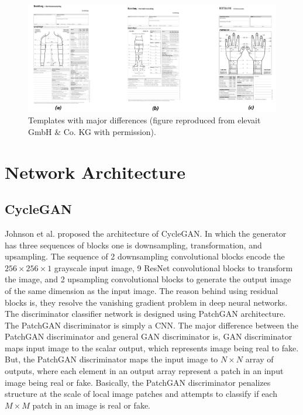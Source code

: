 \begin{figure}[H]
        \begin{center}
	    \includegraphics[scale=0.30]{images/Implementation/TemplatesWithMajorDifference.png}
	    \caption[Templates with major differences.]{Templates with major differences (figure reproduced from elevait GmbH \& Co. KG with permission).}
	    \label{fig:TemplatesWithMajorDifference}
	    \end{center}
\end{figure}






\section{Network Architecture}\label{NetworkArchitecture}

\subsection{\ac{CycleGAN}}

Johnson et al.\cite{johnson2016perceptual} proposed the architecture of \ac{CycleGAN}. In which the generator has three sequences of blocks one is downsampling, transformation, and upsampling. The sequence of 2 downsampling convolutional blocks encode the $256 \times 256 \times 1$ grayscale input image, 9 \ac{ResNet} convolutional blocks to transform the image, and 2 upsampling convolutional blocks to generate the output image of the same dimension as the input image. The reason behind using residual blocks is, they resolve the vanishing gradient problem in deep neural networks. The discriminator classifier network is designed using PatchGAN architecture\cite{isola2018imagetoimage}\cite{li2016precomputed}. The PatchGAN discriminator is simply a \ac{CNN}. The major difference between the PatchGAN discriminator and general \ac{GAN} discriminator is, \ac{GAN} discriminator maps input image to the scalar output, which represents image being real to fake. But, the PatchGAN discriminator maps the input image to $N \times N$ array of outputs, where each element in an output array represent a patch in an input image being real or fake. Basically, the PatchGAN discriminator penalizes structure at the scale of local image patches and attempts to classify if each $M \times M$ patch in an image is real or fake.




